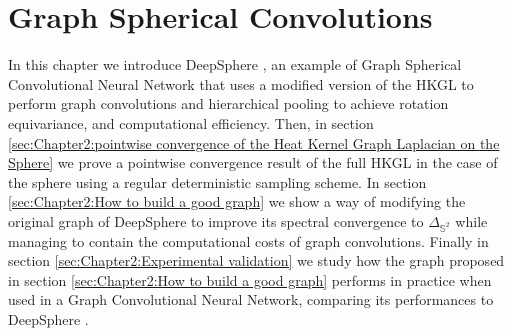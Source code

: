 

\section{Graph Spherical Convolutions}\label{sec:Graph Spherical Convolutions}
In this chapter we introduce DeepSphere \cite{DeepSphere}, an example of Graph Spherical Convolutional Neural Network that uses a modified version of the HKGL to perform graph convolutions and hierarchical pooling to achieve rotation equivariance, and computational efficiency. Then, in section \ref{sec:Chapter2:pointwise convergence of the Heat Kernel Graph Laplacian on the Sphere} we prove a pointwise convergence result of the full HKGL in the case of the sphere using a regular deterministic sampling scheme. In section \ref{sec:Chapter2:How to build a good graph} we show a way of modifying the original graph of DeepSphere to improve its spectral convergence to $\Delta_{\mathbb S^2}$ while managing to contain the computational costs of graph convolutions. Finally in section \ref{sec:Chapter2:Experimental validation} we study how the graph proposed in section \ref{sec:Chapter2:How to build a good graph} performs in practice when used in a Graph Convolutional Neural Network, comparing its performances to DeepSphere \cite{DeepSphere}.
